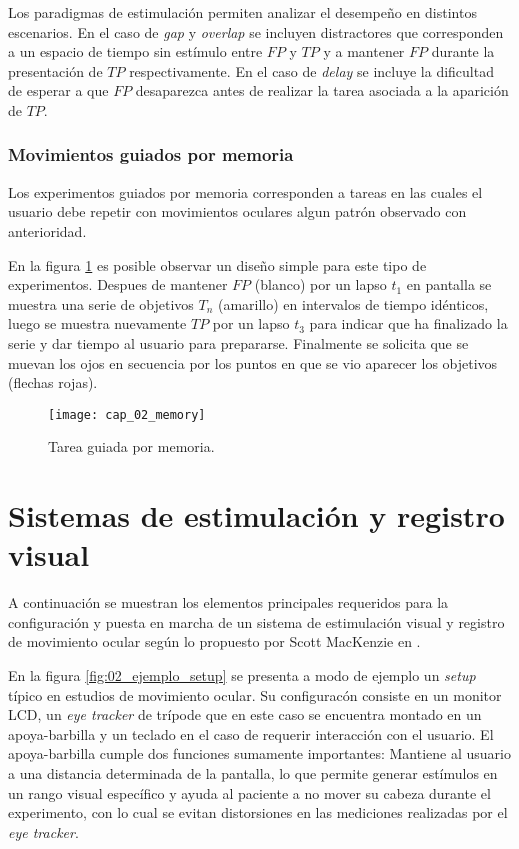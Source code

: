 \documentclass[../main.tex]{subfiles}
\begin{document}
				Los paradigmas de estimulación permiten analizar el desempeño en distintos escenarios. En el caso de \textit{gap} y \textit{overlap} se incluyen distractores que corresponden a un espacio de tiempo sin estímulo entre $FP$ y $TP$ y a mantener $FP$ durante la presentación de $TP$ respectivamente. En el caso de \textit{delay} se incluye la dificultad de esperar a que $FP$ desaparezca antes de realizar la tarea asociada a la aparición de $TP$. 

			\vspace{-5mm}
			\subsubsection{Movimientos guiados por memoria}
			\label{ssub:movimientos_memoria}
				Los experimentos guiados por memoria corresponden a tareas en las cuales el usuario debe repetir con movimientos oculares algun patrón observado con anterioridad. 

				En la figura \ref{fig:02_memory} es posible observar un diseño simple para este tipo de experimentos. Despues de mantener $FP$ (blanco) por un lapso $t_1$ en pantalla se muestra una serie de objetivos $T_n$ (amarillo) en intervalos de tiempo idénticos, luego se muestra nuevamente $TP$ por un lapso $t_3$ para indicar que ha finalizado la serie y dar tiempo al usuario para prepararse. Finalmente se solicita que se muevan los ojos en secuencia por los puntos en que se vio aparecer los objetivos (flechas rojas).
				\begin{figure}[H]
					\centering
					\texttt{[image: cap\_02\_memory]}
					\caption{Tarea guiada por memoria.}
					\label{fig:02_memory}
				\end{figure} 
	
	\section{Sistemas de estimulación y registro visual}
	\label{sec:02_sistemas_de_estimulacion_registro_visual}
		A continuación se muestran los elementos principales requeridos para la configuración y puesta en marcha de un sistema de estimulación visual y registro de movimiento ocular según lo propuesto por Scott MacKenzie en \cite{article:baseInfo}. 

		En la figura \ref{fig:02_ejemplo_setup} se presenta a modo de ejemplo un \textit{setup} típico en estudios de movimiento ocular. Su configuracón consiste en un monitor LCD, un \textit{eye tracker} de trípode que en este caso se encuentra montado en un apoya-barbilla y un teclado en el caso de requerir interacción con el usuario. El apoya-barbilla cumple dos funciones sumamente importantes: Mantiene al usuario a una distancia determinada de la pantalla, lo que permite generar estímulos en un rango visual específico y ayuda al paciente a no mover su cabeza durante el experimento, con lo cual se evitan distorsiones en las mediciones realizadas por el \textit{eye tracker}.  
\end{document}
